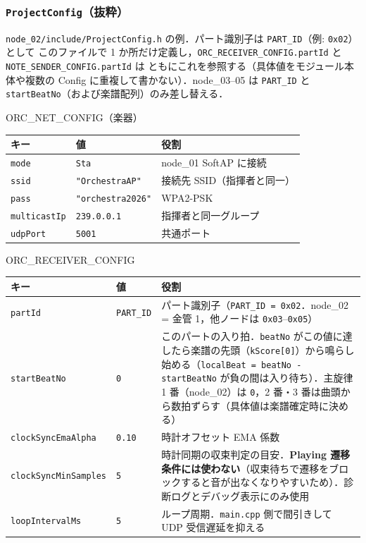 \documentclass[lualatex,book,paper=a4paper,jafontsize=11.5pt,jafontscale=1.05]{jlreq}
\begin{document}
\subsubsection{\texttt{ProjectConfig}（抜粋）}

\texttt{node\_02/include/ProjectConfig.h} の例．パート識別子は \texttt{PART\_ID}（例: \texttt{0x02}）として
このファイルで 1 か所だけ定義し，\texttt{ORC\_RECEIVER\_CONFIG.partId} と \texttt{NOTE\_SENDER\_CONFIG.partId} は
ともにこれを参照する（具体値をモジュール本体や複数の Config に重複して書かない）．node\_03--05 は
\texttt{PART\_ID} と \texttt{startBeatNo}（および楽譜配列）のみ差し替える．

\begin{apibox}{ORC\_NET\_CONFIG（楽器）}
\begin{tabular}{l l p{}}
\toprule
\textbf{キー} & \textbf{値} & \textbf{役割} \\
\midrule
\texttt{mode}        & \texttt{Sta}              & node\_01 SoftAP に接続 \\
\texttt{ssid}        & \texttt{"OrchestraAP"}    & 接続先 SSID（指揮者と同一） \\
\texttt{pass}        & \texttt{"orchestra2026"}  & WPA2-PSK \\
\texttt{multicastIp} & \texttt{239.0.0.1}        & 指揮者と同一グループ \\
\texttt{udpPort}     & \texttt{5001}             & 共通ポート \\
\bottomrule
\end{tabular}
\end{apibox}

\begin{apibox}{ORC\_RECEIVER\_CONFIG}
\begin{tabular}{l l p{}}
\toprule
\textbf{キー} & \textbf{値} & \textbf{役割} \\
\midrule
\texttt{partId}              & \texttt{PART\_ID}  & パート識別子（\texttt{PART\_ID = 0x02}．node\_02 = 金管 1，他ノードは \texttt{0x03}--\texttt{0x05}） \\
\texttt{startBeatNo}         & \texttt{0}     & このパートの入り拍．\texttt{beatNo} がこの値に達したら楽譜の先頭（\texttt{kScore[0]}）から鳴らし始める（\texttt{localBeat = beatNo - startBeatNo} が負の間は入り待ち）．主旋律 1 番（node\_02）は \texttt{0}，2 番・3 番は曲頭から数拍ずらす（具体値は楽譜確定時に決める） \\
\texttt{clockSyncEmaAlpha}   & \texttt{0.10}  & 時計オフセット EMA 係数 \\
\texttt{clockSyncMinSamples} & \texttt{5}     & 時計同期の収束判定の目安．\textbf{Playing 遷移条件には使わない}（収束待ちで遷移をブロックすると音が出なくなりやすいため）．診断ログとデバッグ表示にのみ使用 \\
\texttt{loopIntervalMs}      & \texttt{5}     & ループ周期．\texttt{main.cpp} 側で間引きして UDP 受信遅延を抑える \\
\bottomrule
\end{tabular}
\end{apibox}
\end{document}
